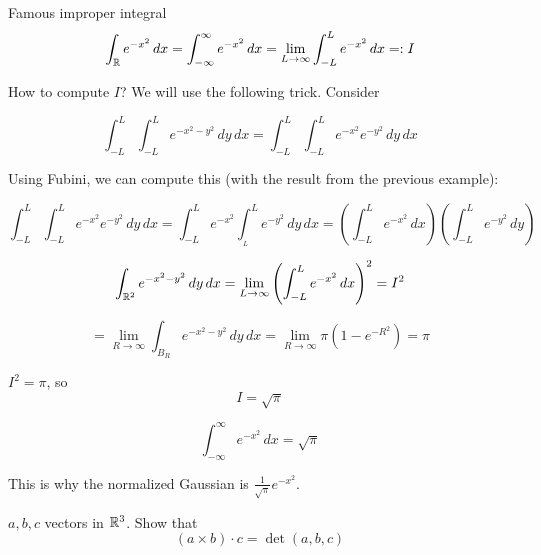 \documentclass[12pt]{article}
\begin{document}
\begin{example}{Famous improper integral}{}
$$
\int_{\mathbb{R}} e^{-x^2} \,dx = \int_{-\infty}^{\infty} e^{-x^2} \,dx = \lim_{L \rightarrow \infty} \int_{-L}^{L} e^{-x^2} \,dx =: I
$$

How to compute $I$? We will use the following trick. Consider 

$$
\int_{-L}^{L} \int_{-L}^{L} e^{-x^2-y^2} \,dy \,dx = \int_{-L}^{L} \int_{-L}^{L} e^{-x^2}e^{-y^2} \,dy \,dx
$$

Using Fubini, we can compute this (with the result from the previous example):

$$
\int_{-L}^{L} \int_{-L}^{L} e^{-x^2}e^{-y^2} \,dy \,dx = \int_{-L}^{L} e^{-x^2} \int_{_L}^{L} e^{-y^2} \,dy \,dx = \left(\int_{-L}^{L} e^{-x^2} \,dx\right) \left(\int_{-L}^{L} e^{-y^2} \,dy\right)
$$

$$
\int_{\mathbb{R}^2} e^{-x^2-y^2} \,dy \,dx = \lim_{L \rightarrow \infty} \left(\int_{-L}^{L} e^{-x^2} \,dx\right)^2 = I^2
$$

$$
= \lim_{R \rightarrow \infty} \int_{B_R} e^{-x^2-y^2} \,dy\,dx = \lim_{R \rightarrow \infty} \pi(1 - e^{-R^2}) = \pi
$$

$I^2 = \pi$, so \[
\boxed{I = \sqrt{\pi}}
\]

$$
\int_{-\infty}^{\infty} e^{-x^2} \,dx = \sqrt{\pi}
$$

This is why the normalized Gaussian is $\frac{1}{\sqrt{\pi}} e^{-x^2}$.
\end{example}

\begin{exercise}{}{}
$a, b, c$ vectors in $\mathbb{R}^3$. Show that 
$$
(a \times b) \cdot c = \det(a, b, c)
$$
\end{exercise}
\end{document}
